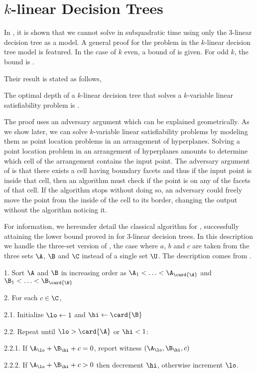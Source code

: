 \section{$k$-linear Decision Trees}

In \citet*{erickson:1999}, it is shown that we cannot solve \threeSUM in
subquadratic time using only the $3$-linear decision tree as a model. A general
proof for the \kLDT problem in the $k$-linear decision tree model is featured.
In the case of $k$ even, a bound of  is given. For
odd $k$, the bound is .

Their result is stated as follows,
\begin{theorem}
The optimal depth of a \(k\)-linear decision tree that solves
a \(k\)-variable linear satisfiability problem is .
\end{theorem}

The proof uses an adversary argument which can be explained geometrically. As
we show later, we can solve \(k\)-variable linear satisfiability problems
by modeling them as point location problems in an arrangement of hyperplanes.
Solving a point location problem in an arrangement of hyperplanes amounts to
determine which cell of the arrangement contains the input point. The adversary
argument of \citet*{erickson:1999} is that there exists a cell having
 boundary facets and thus if the input point is inside
that cell, then an algorithm must check if the point is on any of the facets of
that cell. If the algorithm stops without doing so, an adversary could freely
move the point from the inside of the cell to its border, changing the output
without the algorithm noticing it.

For information, we hereunder detail the classical  algorithm for
\threeSUM, successfully attaining the lower bound proved in
\cite{erickson:1999} for $3$-linear decision trees. In this description we
handle the three-set version of \threeSUM, \ie the case where $a$, $b$ and $c$
are taken from the three sets $\A$, $\B$ and $\C$ instead of a single set $\U$.
The description comes from \citet*{gronlund:2014}.


\begin{algorithm}
\item[1.] Sort $\A$ and $\B$ in increasing order as $\A_1 < \ldots <
\A_{\card{\A}}$ and $\B_1 < \ldots < \B_{\card{\B}}$
\item[2.] For each $c \in \C$,
\item[2.1.] Initialize $\lo \gets 1$ and $\hi \gets \card{\B}$
\item[2.2.] Repeat until $\lo > \card{\A}$ or $\hi < 1$:
\item[2.2.1.] If $\A_{\lo} + \B_{\hi} + c = 0$, report witness $(\A_{\lo},
\B_{\hi}, c)$
\item[2.2.2.] If $\A_{\lo} + \B_{\hi} + c > 0$ then decrement $\hi$, otherwise
increment $\lo$.
\end{algorithm}


